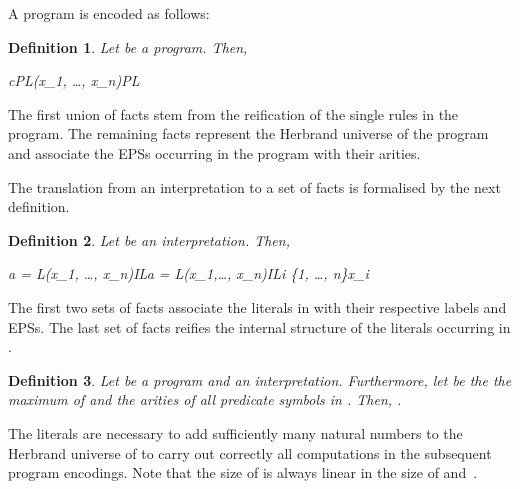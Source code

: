 \documentclass{tlp}
\newtheorem{definition}{Definition}
\begin{document}
A program is encoded as follows:
\begin{definition}
Let  be a program. Then, 
\begin{center}
cPL(x_1, \ldots, x_n)PL
\end{center}
\end{definition}

 The first union of facts stem from the reification of the single rules in the program.
The remaining facts  represent the Herbrand universe of the program and 
associate the EPSs occurring in the program with their
arities.

The translation from an interpretation to a set of facts is formalised by the next definition.
\begin{definition}
Let   be an interpretation. Then, 
\begin{center}
a = L(x_{1}, \ldots, x_{n})ILa = L(x_{1},\ldots, x_{n})ILi \in \{1, \ldots, n\}x_{i}
\end{center}
\end{definition}

The first two sets of facts associate the literals in   with their respective labels and 
EPSs.
The last set of facts reifies the internal structure of the literals occurring in . 

\begin{definition}
Let  be a program and  an interpretation. 
Furthermore, let  be the  the maximum of  and the arities of all predicate symbols in .
Then, .

\end{definition}
The literals   are necessary  to add sufficiently many natural numbers to the Herbrand universe of  to carry out correctly all computations in the subsequent program encodings. 
Note that the size of   is always linear in the size
of  and~.
\end{document}
